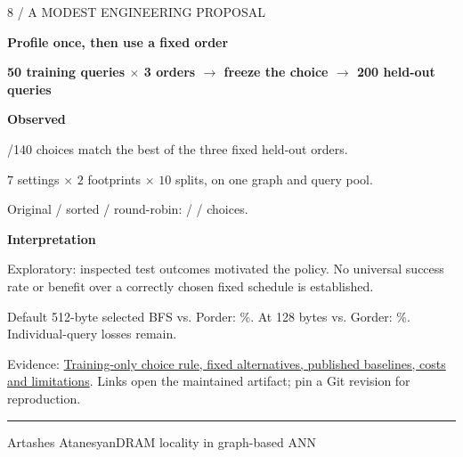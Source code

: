\documentclass[11pt]{article}
\newenvironment{slide}[2]{%
  \clearpage\color{ink}\fontsize{14}{18}\selectfont
  {\fontsize{10}{12}\selectfont\color{accent}\MakeUppercase{#1}\par}
  {\fontsize{25}{29}\selectfont\bfseries #2\par}\vspace{4pt}
}{%
  \vfill{\color{accent}\hrule}\vspace{4pt}
  {\fontsize{9}{11}\selectfont\color{muted}Artashes Atanesyan\hfill DRAM locality in graph-based ANN\hfill\thepage\par}
}
\newcommand{\takeaway}[1]{\par\vspace{3pt}\colorbox{wash}{\parbox{\dimexpr\linewidth-2\fboxsep\relax}{\strut\textbf{#1}\strut}}\par}
\newcommand{\evidence}[2]{\vfill{\fontsize{9}{11}\selectfont\color{muted}Evidence: \href{https://github.com/senqx/Thesis-PIM-ANN/blob/main/#1}{#2}. Links open the maintained artifact; pin a Git revision for reproduction.\par}}
\begin{document}
\begin{slide}{8 / A modest engineering proposal}{Profile once, then use a fixed order}
\takeaway{50 training queries $\times$ 3 orders $\longrightarrow$ freeze the choice $\longrightarrow$ 200 held-out queries}
\begin{minipage}[t]{0.48\linewidth}
\textbf{Observed}\par
\ProfileOracleMatches/140 choices match the best of the three fixed held-out orders.\par
$7$ settings $\times$ $2$ footprints $\times$ $10$ splits, on one graph and query pool.\par
Original / sorted / round-robin:\newline
\ProfileOriginalChoices{} / \ProfileSortedChoices{} / \ProfileRRChoices{} choices.
\end{minipage}\hfill
\begin{minipage}[t]{0.48\linewidth}
\textbf{Interpretation}\par
Exploratory: inspected test outcomes motivated the policy. No universal success rate or benefit over a correctly chosen fixed schedule is established.\par
Default 512-byte selected BFS vs. Porder: \mbox{\ProfileVsPorderFloat\%}.\newline
At 128 bytes vs. Gorder: \mbox{\ProfileVsGorderCompact\%}. Individual-query losses remain.
\end{minipage}
\evidence{doc/profiled_fetch_results.tex}{Training-only choice rule, fixed alternatives, published baselines, costs and limitations}
\end{slide}
\end{document}
